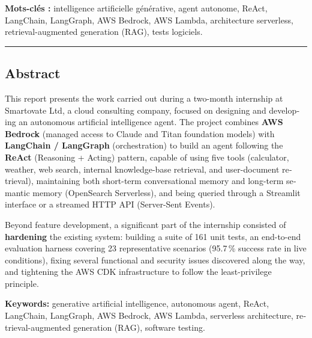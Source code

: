 \documentclass[11pt,a4paper]{report}
\begin{document}
\textbf{Mots-clés :} intelligence artificielle générative, agent
autonome, ReAct, LangChain, LangGraph, AWS Bedrock, AWS Lambda,
architecture serverless, retrieval-augmented generation (RAG), tests
logiciels.

\vspace{0.8cm}
\begin{center}\rule{0.4\linewidth}{0.4pt}\end{center}
\vspace{0.5cm}

\begin{otherlanguage}{english}
\chapter*{Abstract}

This report presents the work carried out during a two-month
internship at Smartovate Ltd, a cloud consulting company, focused on
designing and developing an autonomous artificial intelligence agent.
The project combines \textbf{AWS Bedrock} (managed access to Claude
and Titan foundation models) with \textbf{LangChain / LangGraph}
(orchestration) to build an agent following the \textbf{ReAct}
(Reasoning + Acting) pattern, capable of using five tools (calculator,
weather, web search, internal knowledge-base retrieval, and
user-document retrieval), maintaining both short-term conversational
memory and long-term semantic memory (OpenSearch Serverless), and
being queried through a Streamlit interface or a streamed HTTP API
(Server-Sent Events).

Beyond feature development, a significant part of the internship
consisted of \textbf{hardening} the existing system: building a suite
of 161 unit tests, an end-to-end evaluation harness covering 23
representative scenarios (95.7\,\% success rate in live conditions),
fixing several functional and security issues discovered along the
way, and tightening the AWS CDK infrastructure to follow the
least-privilege principle.

\textbf{Keywords:} generative artificial intelligence, autonomous
agent, ReAct, LangChain, LangGraph, AWS Bedrock, AWS Lambda,
serverless architecture, retrieval-augmented generation (RAG),
software testing.
\end{otherlanguage}

\tableofcontents

\listoffigures
{}
\end{document}
